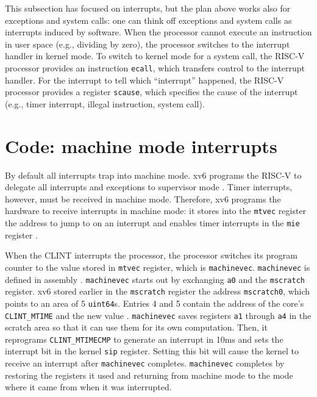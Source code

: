 This subsection has focused on interrupts, but the plan above works
also for exceptions and system calls: one can think off exceptions and
system calls as interrupts induced by software.  When the processor
cannot execute an instruction in user space (e.g., dividing by zero),
the processor switches to the interrupt handler in kernel mode.  To
switch to kernel mode for a system call, the RISC-V processor provides
an instruction \lstinline{ecall}, which
transfers control to the interrupt handler.  For the interrupt to tell
which ``interrupt'' happened, the RISC-V processor provides a register
\lstinline{scause}, which specifies
the cause of the interrupt (e.g., timer interrupt, illegal
instruction, system call).


\section{Code: machine mode interrupts}

By default all interrupts trap into machine mode.  xv6 programs the
RISC-V to delegate all interrupts and exceptions to supervisor mode
.
Timer interrupts, however, must be received in machine
mode. Therefore, xv6 programs the hardware to receive interrupts in
machine mode: it stores into the \lstinline{mtvec} register the
address to jump to on an interrupt 
and enables timer interrupts in the \lstinline{mie} register
.

When the CLINT interrupts the processor, the processor switches its
program counter to the value stored in \lstinline{mtvec} register,
which is \lstinline{machinevec}.  \lstinline{machinevec} is defined in
assembly .
\lstinline{machinevec} starts out by exchanging \lstinline{a0} and the
\lstinline{mscratch} register.  xv6 stored earlier in the
\lstinline{mscratch} register  the
address \lstinline{mscratch0}, which points to an area of 5
\lstinline{uint64}s.  Entries 4 and 5 contain the address of the
core's \lstinline{CLINT_MTIME} and the new value
.
\lstinline{machinevec} saves registers \lstinline{a1} through
\lstinline{a4} in the scratch area so that it can use them for its own
computation.  Then, it reprograms \lstinline{CLINT_MTIMECMP} to
generate an interrupt in 10ms and sets the interrupt bit in the kernel
\lstinline{sip} register.  Setting this bit will cause the kernel to
receive an interrupt after \lstinline{machinevec} completes.
\lstinline{machinevec} completes by restoring the registers it used
and returning from machine mode  to
the mode where it came from when it was interrupted.


